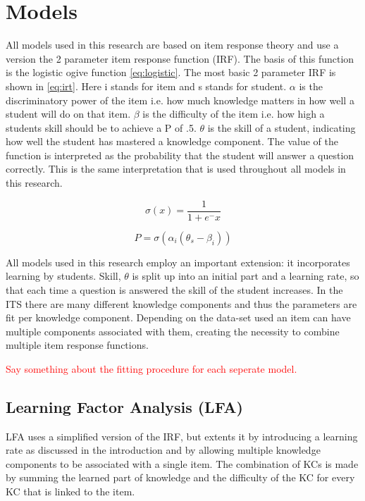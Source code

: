 \documentclass{article}
\newcommand\todo[1]{\textcolor{red}{#1}}
\begin{document}
\section{Models}
All models used in this research are based on item response theory and use a version the 2 parameter item response function (IRF). The basis of this function is the logistic ogive function \ref{eq:logistic}. The most basic 2 parameter IRF is shown in \ref{eq:irt}. Here i stands for item and s stands for student. $\alpha$ is the discriminatory power of the item i.e. how much knowledge matters in how well a student will do on that item. $\beta$ is the difficulty of the item i.e. how high a students skill should be to achieve a P of .5. $\theta$ is the skill of a student, indicating how well the student has mastered a knowledge component. The value of the function is interpreted as the probability that the student will answer a question correctly. This is the same interpretation that is used throughout all models in this research.

\begin{equation}
\label{eq:logistic}
\sigma(x) = \frac{1}{1+e^-x}
\end{equation}

\begin{equation}
\label{eq:irt}
P = \sigma(\alpha_{i} (\theta_{s} - \beta_{i}))
\end{equation}

All models used in this research employ an important extension: it incorporates learning by students. Skill, $\theta$ is split up into an initial part and a learning rate, so that each time a question is answered the skill of the student increases. In the ITS there are many different knowledge components and thus the parameters are fit per knowledge component. Depending on the data-set used an item can have multiple components associated with them, creating the necessity to combine multiple item response functions.

\todo{Say something about the fitting procedure for each seperate model.}

\subsection{Learning Factor Analysis (LFA)}
\label{sec:LFA}


LFA uses a simplified version of the IRF, but extents it by introducing a learning rate as discussed in the introduction and by allowing multiple knowledge components to be associated with a single item. The combination of KCs is made by summing the learned part of knowledge and the difficulty of the KC for every KC that is linked to the item.
\end{document}
